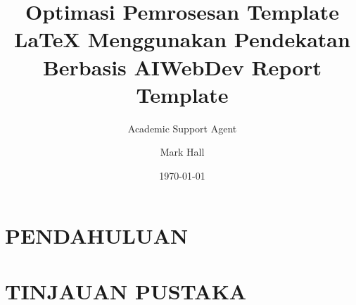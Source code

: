 \documentclass{ehu_webdev_report}
\title{Optimasi Pemrosesan Template LaTeX Menggunakan Pendekatan Berbasis AI}
\author{Academic Support Agent}
\date{\today}
\begin{document}
\maketitle

\begin{abstract}

\end{abstract}

\chapter{PENDAHULUAN}


\chapter{TINJAUAN PUSTAKA}



\title{WebDev Report Template} %
\author{Mark Hall}             %


\end{document}
